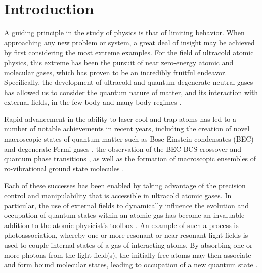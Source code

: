 \chapter{Introduction} \label{ch:intro}
A guiding principle in the study of physics is that of limiting behavior.
When approaching any new problem or system, a great deal of insight may be achieved by first considering the most extreme examples.
For the field of ultracold atomic physics, this extreme has been the pursuit of near zero-energy atomic and molecular gases, which has proven to be an incredibly fruitful endeavor.
Specifically, the development of ultracold and quantum degenerate neutral gases has allowed us to consider the quantum nature of matter, and its interaction with external fields, in the few-body and many-body regimes \cite{gps08,Kohler2006,wbz99,ccg11,swm10,bdz08,Chin2010,Bertelson2007,mmn11,bdz08}.

Rapid advancement in the ability to laser cool and trap atoms \cite{mvs99,mvs99,psm02} has led to a number of notable achievements in recent years, including the creation of novel macroscopic states of quantum matter such as Bose-Einstein condensates (BEC) and degenerate Fermi gases \cite{Truscott2001,aem95,Bradley1995,dma95,DeMarco1999,zhg03,MartinezdeEscolar2010,Mickelson2010ja,dym10,stg10}, the observation of the BEC-BCS crossover and quantum phase transitions \cite{rgj04,zss04,cba04Science,Bourdel2004,grj03,gme02,jsg08,Snoke2002,zbb14}, as well as the formation of macroscopic ensembles of ro-vibrational ground state molecules \cite{rtb03,Jones2006, Reinaudi2012,Stellmer2012,nom08,Lang2008}.

Each of these successes has been enabled by taking advantage of the precision control and manipulability that is accessible in ultracold atomic gases.
In particular, the use of external fields to dynamically influence the evolution and occupation of quantum states within an atomic gas has become an invaluable addition to the atomic physicist's toolbox \cite{Chin2010}.
An example of such a process is photoassociation, whereby one or more resonant or near-resonant light fields is used to couple internal states of a gas of interacting atoms.
By absorbing one or more photons from the light field(s), the initially free atoms may then associate and form bound molecular states, leading to occupation of a new quantum state \cite{Kohler2006, Jones2006, Burnett2002}.

